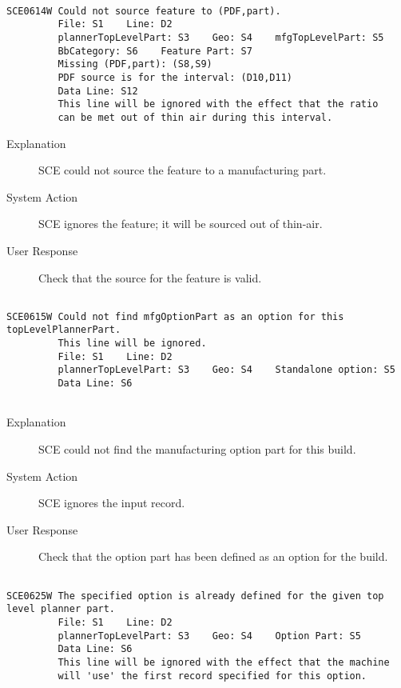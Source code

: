 \hrulefill
\begin{verbatim}

SCE0614W Could not source feature to (PDF,part).
         File: S1    Line: D2
         plannerTopLevelPart: S3    Geo: S4    mfgTopLevelPart: S5
         BbCategory: S6    Feature Part: S7
         Missing (PDF,part): (S8,S9)
         PDF source is for the interval: (D10,D11)
         Data Line: S12
         This line will be ignored with the effect that the ratio 
         can be met out of thin air during this interval.
\end{verbatim}
\begin{description}
\item[Explanation]  SCE could not source the feature to a manufacturing part.

\item[System Action]  SCE ignores the feature;  it will be sourced out of thin-air.

\item[User Response]  Check that the source for the feature is valid.
\end{description}
\hrulefill
\begin{verbatim}

SCE0615W Could not find mfgOptionPart as an option for this topLevelPlannerPart.
         This line will be ignored.
         File: S1    Line: D2
         plannerTopLevelPart: S3    Geo: S4    Standalone option: S5
         Data Line: S6
         
\end{verbatim}
\begin{description}
\item[Explanation]  SCE could not find the manufacturing option part for this build.

\item[System Action]  SCE ignores the input record.

\item[User Response]  Check that the option part has been defined as an option for the build.
\end{description}
\hrulefill
\begin{verbatim}

SCE0625W The specified option is already defined for the given top level planner part.
         File: S1    Line: D2
         plannerTopLevelPart: S3    Geo: S4    Option Part: S5
         Data Line: S6
         This line will be ignored with the effect that the machine
         will 'use' the first record specified for this option.
\end{verbatim}
